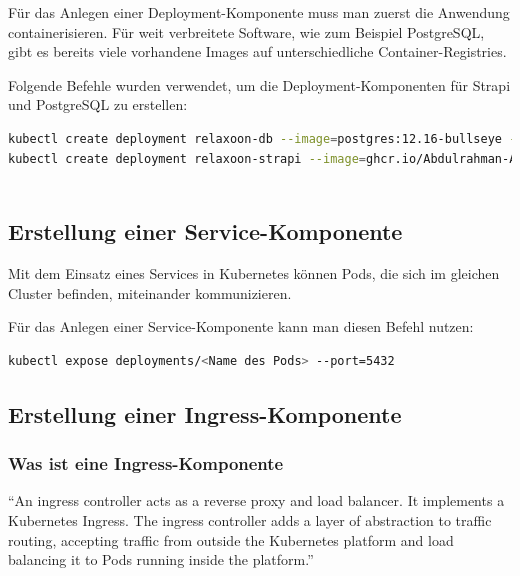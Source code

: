 Für das Anlegen einer Deployment-Komponente muss man zuerst die Anwendung containerisieren.
Für weit verbreitete Software, wie zum Beispiel PostgreSQL, gibt es bereits viele vorhandene Images auf unterschiedliche Container-Registries.

Folgende Befehle wurden verwendet, um die Deployment-Komponenten für Strapi und PostgreSQL zu erstellen:

\begin{lstlisting}[language=bash, caption=create k8s deployments]
kubectl create deployment relaxoon-db --image=postgres:12.16-bullseye --port=5432
kubectl create deployment relaxoon-strapi --image=ghcr.io/Abdulrahman-AL-Sabagh/relaxoon-strapi:latest --port=8080
    
\end{lstlisting}




\subsection{Erstellung einer Service-Komponente}

Mit dem Einsatz eines Services in Kubernetes können Pods,
die sich im gleichen Cluster befinden, miteinander kommunizieren. \cite{k8s-service}

Für das Anlegen einer Service-Komponente kann man diesen Befehl nutzen:

\begin{lstlisting}[language=bash,caption=create a service component]
kubectl expose deployments/<Name des Pods> --port=5432
\end{lstlisting}






\subsection{Erstellung einer Ingress-Komponente}

\subsubsection{Was ist eine Ingress-Komponente}
``An ingress controller acts as a reverse proxy and load balancer.
It implements a Kubernetes Ingress.
The ingress controller adds a layer of abstraction to traffic routing,
accepting traffic from outside the Kubernetes platform and load balancing
it to Pods running inside the platform.''
\cite{ingress}

